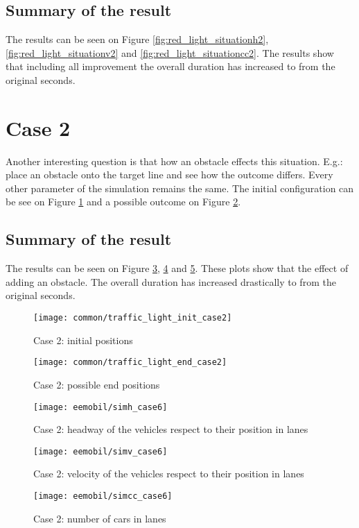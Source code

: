 			\subsection*{Summary of the result}
			The results can be seen on Figure \ref{fig:red_light_situationh2}, \ref{fig:red_light_situationv2} and \ref{fig:red_light_situationcc2}. The results show that including all improvement the overall duration has increased to from the original seconds.
		\section{Case 2}
			Another interesting question is that how an obstacle effects this situation. E.g.: place an obstacle onto the target line and see how the outcome differs. Every other parameter of the simulation remains the same. The initial configuration can be see on Figure \ref{fig:traffic_light_init2} and a possible outcome on Figure \ref{fig:traffic_light_end2}.
			\subsection*{Summary of the result}
			The results can be seen on Figure \ref{fig:red_light_situationh3}, \ref{fig:red_light_situationv3} and \ref{fig:red_light_situationcc3}. These plots show that the effect of adding an obstacle. The overall duration has increased drastically to from the original seconds.
			\begin{figure}[ht]
				\centering
				\texttt{[image: common/traffic\_light\_init\_case2]}
				\caption{Case 2: initial positions}
				\label{fig:traffic_light_init2}
			\end{figure}
			\begin{figure}[ht]
				\centering
				\texttt{[image: common/traffic\_light\_end\_case2]}
				\caption{Case 2: possible end positions}
				\label{fig:traffic_light_end2}
			\end{figure}
			\begin{figure}
				\centering
				\texttt{[image: eemobil/simh\_case6]}
				\caption{Case 2: headway of the vehicles respect to their position in lanes}
				\label{fig:red_light_situationh3}
			\end{figure}
			\begin{figure}
				\centering
				\texttt{[image: eemobil/simv\_case6]}
				\caption{Case 2: velocity of the vehicles respect to their position in lanes}
				\label{fig:red_light_situationv3}
			\end{figure}
			\begin{figure}
				\centering
				\texttt{[image: eemobil/simcc\_case6]}
				\caption{Case 2: number of cars in lanes}
				\label{fig:red_light_situationcc3}
			\end{figure}